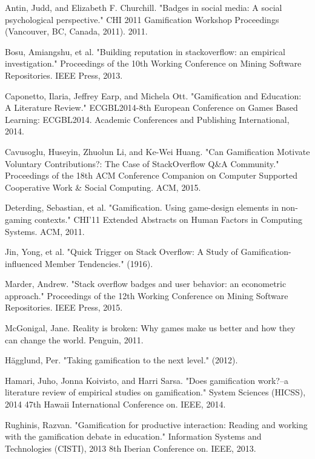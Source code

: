 \documentclass{sigchi}
\begin{document}
\begin{thebibliography}{9}

Antin, Judd, and Elizabeth F. Churchill. "Badges in social media: A social psychological perspective." CHI 2011 Gamification Workshop Proceedings (Vancouver, BC, Canada, 2011). 2011.

Bosu, Amiangshu, et al. "Building reputation in stackoverflow: an empirical investigation." Proceedings of the 10th Working Conference on Mining Software Repositories. IEEE Press, 2013.

Caponetto, Ilaria, Jeffrey Earp, and Michela Ott. "Gamification and Education: A Literature Review." ECGBL2014-8th European Conference on Games Based Learning: ECGBL2014. Academic Conferences and Publishing International, 2014.

Cavusoglu, Huseyin, Zhuolun Li, and Ke-Wei Huang. "Can Gamification Motivate Voluntary Contributions?: The Case of StackOverflow Q\&A Community." Proceedings of the 18th ACM Conference Companion on Computer Supported Cooperative Work \& Social Computing. ACM, 2015.

Deterding, Sebastian, et al. "Gamification. Using game-design elements in non-gaming contexts." CHI'11 Extended Abstracts on Human Factors in Computing Systems. ACM, 2011.

Jin, Yong, et al. "Quick Trigger on Stack Overflow: A Study of Gamification-influenced Member Tendencies." (1916).

Marder, Andrew. "Stack overflow badges and user behavior: an econometric approach." Proceedings of the 12th Working Conference on Mining Software Repositories. IEEE Press, 2015.

McGonigal, Jane. Reality is broken: Why games make us better and how they can change the world. Penguin, 2011.

Hägglund, Per. "Taking gamification to the next level." (2012).

Hamari, Juho, Jonna Koivisto, and Harri Sarsa. "Does gamification work?--a literature review of empirical studies on gamification." System Sciences (HICSS), 2014 47th Hawaii International Conference on. IEEE, 2014.

Rughinis, Razvan. "Gamification for productive interaction: Reading and working with the gamification debate in education." Information Systems and Technologies (CISTI), 2013 8th Iberian Conference on. IEEE, 2013.


\end{thebibliography}
\end{document}
